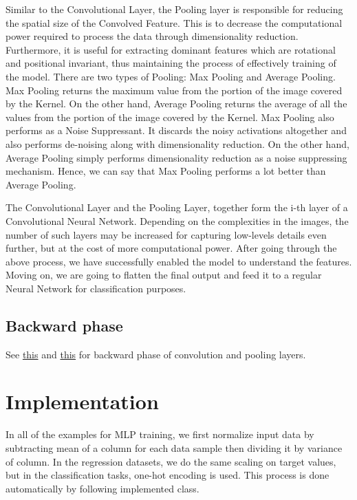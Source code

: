 \documentclass[10pt]{SelfArx} %
\begin{document}
Similar to the Convolutional Layer, the Pooling layer is responsible for reducing the spatial size of the Convolved Feature. This is to decrease the computational power required to process the data through dimensionality reduction. Furthermore, it is useful for extracting dominant features which are rotational and positional invariant, thus maintaining the process of effectively training of the model.
There are two types of Pooling: Max Pooling and Average Pooling. Max Pooling returns the maximum value from the portion of the image covered by the Kernel. On the other hand, Average Pooling returns the average of all the values from the portion of the image covered by the Kernel.
Max Pooling also performs as a Noise Suppressant. It discards the noisy activations altogether and also performs de-noising along with dimensionality reduction. On the other hand, Average Pooling simply performs dimensionality reduction as a noise suppressing mechanism. Hence, we can say that Max Pooling performs a lot better than Average Pooling.

The Convolutional Layer and the Pooling Layer, together form the i-th layer of a Convolutional Neural Network. Depending on the complexities in the images, the number of such layers may be increased for capturing low-levels details even further, but at the cost of more computational power.
After going through the above process, we have successfully enabled the model to understand the features. Moving on, we are going to flatten the final output and feed it to a regular Neural Network for classification purposes.

\subsection{Backward phase}
See \href{https://medium.com/@2017csm1006/forward-and-backpropagation-in-convolutional-neural-network-4dfa96d7b37e}{this} and \href{https://becominghuman.ai/back-propagation-in-convolutional-neural-networks-intuition-and-code-714ef1c38199}{this} for backward phase of convolution and pooling layers.


\section{Implementation}

In all of the examples for MLP training, we first normalize input data by subtracting mean of a column for each data sample then dividing it by variance of column. In the regression datasets, we do the same scaling on target values, but in the classification tasks, one-hot encoding is used.
This process is done automatically by following implemented class.
\end{document}
